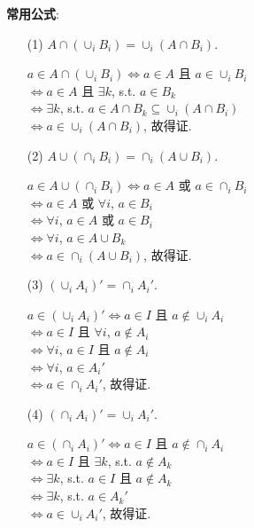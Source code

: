 \documentclass{note}
\begin{document}
\textbf{常用公式}:
\begin{itemize}
    \item[(1)] $A\cap(\cup_i B_i)=\cup_i(A\cap B_i)$.
    \begin{pf}
        $a\in A\cap(\cup_i B_i)\Longleftrightarrow a\in A$ 且 $a\in \cup_iB_i$\\
        $\Longleftrightarrow a\in A$ 且 $\exists k$, s.t. $a\in B_k$\\
        $\Longleftrightarrow\exists k$, s.t. $a\in A\cap B_k\subseteq\cup_i(A\cap B_i)$\\
        $\Longleftrightarrow a\in\cup_i(A\cap B_i)$, 故得证.
    \end{pf}
    \item[(2)] $A\cup(\cap_iB_i)=\cap_i(A\cup B_i)$.
    \begin{pf}
        $a\in A\cup(\cap_iB_i)\Longleftrightarrow a\in A$ 或 $a\in\cap_iB_i$\\
        $\Longleftrightarrow a\in A$ 或 $\forall i$, $a\in B_i$\\
        $\Longleftrightarrow\forall i$, $a\in A$ 或 $a\in B_i$\\
        $\Longleftrightarrow\forall i$, $a\in A\cup B_k$\\
        $\Longleftrightarrow a\in\cap_i(A\cup B_i)$, 故得证.
    \end{pf}
    \item[(3)] $(\cup_iA_i)'=\cap_iA_i'$.
    \begin{pf}
        $a\in(\cup_iA_i)'\Longleftrightarrow a\in I$ 且 $a\notin\cup_iA_i$\\
        $\Longleftrightarrow a\in I$ 且 $\forall i$, $a\notin A_i$\\
        $\Longleftrightarrow\forall i$, $a\in I$ 且 $a\notin A_i$\\
        $\Longleftrightarrow\forall i$, $a\in A_i'$\\
        $\Longleftrightarrow a\in\cap_iA_i'$, 故得证.
    \end{pf}
    \item[(4)] $(\cap_iA_i)'=\cup_iA_i'$.
    \begin{pf}
        $a\in(\cap_iA_i)'\Longleftrightarrow a\in I$ 且 $a\notin\cap_iA_i$\\
        $\Longleftrightarrow a\in I$ 且 $\exists k$, s.t. $a\notin A_k$\\
        $\Longleftrightarrow\exists k$, s.t. $a\in I$ 且 $a\notin A_k$\\
        $\Longleftrightarrow\exists k$, s.t. $a\in A_k'$\\
        $\Longleftrightarrow a\in\cup_iA_i'$, 故得证.
    \end{pf}
\end{itemize}
\end{document}
